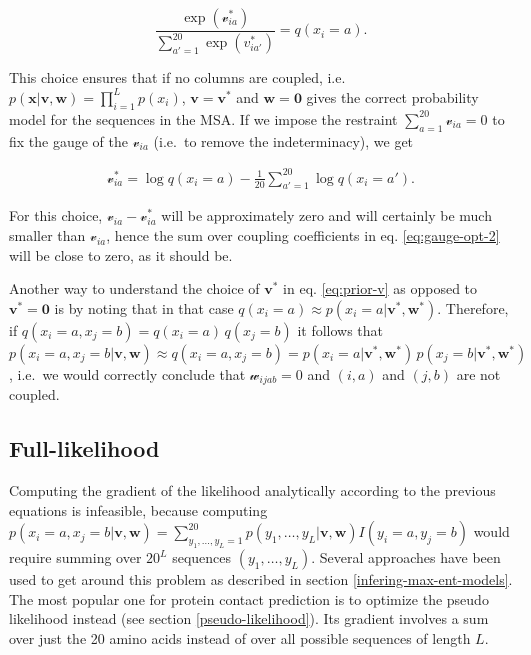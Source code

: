 \documentclass[12pt,a4paper,twoside]{book}
\newcommand{\eq}{\!=\!}
\newcommand{\seq}{\mathbf{x}}
\renewcommand{\v}{\mathbf{v}}
\newcommand{\via}{\mathcal{v}_{ia}}
\newcommand{\w}{\mathbf{w}}
\newcommand{\wijab}{\mathcal{w}_{ijab}}
\theoremstyle{definition}
\theoremstyle{definition}
\theoremstyle{remark}
\begin{document}
\begin{equation}
  \frac{\exp(\via^*)}{\sum_{a'=1}^{20} \exp(v_{ia'}^*)} = q(x_i=a) .
\end{equation}

This choice ensures that if no columns are coupled, i.e.
\(p(\seq | \v,\w) = \prod_{i=1}^L p(x_i)\), \(\v=\v^*\) and
\(\w= \mathbf{0}\) gives the correct probability model for the sequences
in the MSA. If we impose the restraint \(\sum_{a=1}^{20} \via = 0\) to
fix the gauge of the \(\via\) (i.e.~to remove the indeterminacy), we get

\begin{align}
\via^* = \log q(x_i=a) - \frac{1}{20} \sum_{a'=1}^{20} \log q(x_i=a') .
\label{eq:prior-v}
\end{align}

For this choice, \(\via - \via^*\) will be approximately zero and will
certainly be much smaller than \(\via\), hence the sum over coupling
coefficients in eq. \eqref{eq:gauge-opt-2} will be close to zero, as it
should be.

Another way to understand the choice of \(\v^*\) in eq. \eqref{eq:prior-v}
as opposed to \(\v^*=\mathbf{0}\) is by noting that in that case
\(q(x_i \eq a) \approx p(x_i \eq a|\v^*,\w^*)\). Therefore, if
\(q(x_i \eq a,x_j \eq b) = q(x_i \eq a) \, q(x_j \eq b)\) it follows
that
\(p(x_i \eq a, x_j \eq b | \v,\w) \approx q(x_i \eq a, x_j \eq b) = p(x_i \eq a | \v^*,\w^*)\, p(x_j \eq b | \v^*,\w^*)\),
i.e.~we would correctly conclude that \(\wijab=0\) and \((i,a)\) and
\((j,b)\) are not coupled.

\subsection{Full-likelihood}\label{full-likelihood}

Computing the gradient of the likelihood analytically according to the
previous equations is infeasible, because computing
\(p(x_i \eq a, x_j \eq b | \v, \w) = \sum_{y_1, \dots, y_L =1}^{20} p(y_1, \dots, y_L | \v, \w) I(y_i \eq a, y_j \eq b)\)
would require summing over \(20^L\) sequences \((y_1,\ldots,y_L)\).
Several approaches have been used to get around this problem as
described in section \ref{infering-max-ent-models}. The most popular one
for protein contact prediction is to optimize the pseudo likelihood
instead (see section \ref{pseudo-likelihood}). Its gradient involves a
sum over just the 20 amino acids instead of over all possible sequences
of length \(L\).
\end{document}
